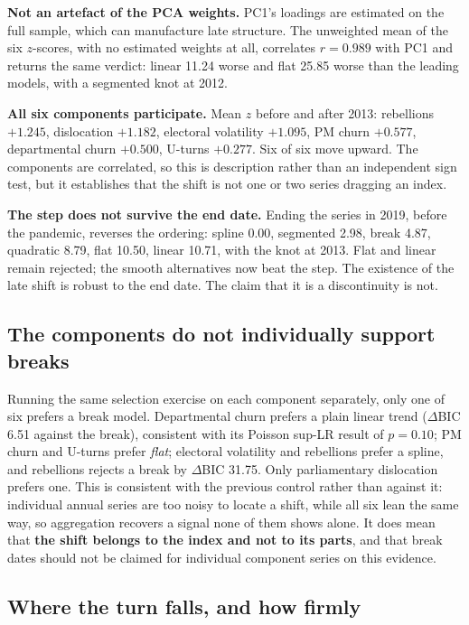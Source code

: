 \textbf{Not an artefact of the PCA weights.} PC1's loadings are estimated on the full sample, which
can manufacture late structure. The unweighted mean of the six $z$-scores, with no estimated weights
at all, correlates $r=0.989$ with PC1 and returns the same verdict: linear 11.24 worse and flat
25.85 worse than the leading models, with a segmented knot at 2012.

\textbf{All six components participate.} Mean $z$ before and after 2013: rebellions $+1.245$,
dislocation $+1.182$, electoral volatility $+1.095$, PM churn $+0.577$, departmental churn $+0.500$,
U-turns $+0.277$. Six of six move upward. The components are correlated, so this is description
rather than an independent sign test, but it establishes that the shift is not one or two series
dragging an index.

\textbf{The step does not survive the end date.} Ending the series in 2019, before the pandemic,
reverses the ordering: spline 0.00, segmented 2.98, break 4.87, quadratic 8.79, flat 10.50, linear
10.71, with the knot at 2013. Flat and linear remain rejected; the smooth alternatives now beat the
step. The existence of the late shift is robust to the end date. The claim that it is a
discontinuity is not.

\subsection*{The components do not individually support breaks}

Running the same selection exercise on each component separately, only one of six prefers a break
model. Departmental churn prefers a plain linear trend ($\Delta$BIC 6.51 against the break),
consistent with its Poisson sup-LR result of $p=0.10$; PM churn and U-turns prefer \emph{flat};
electoral volatility and rebellions prefer a spline, and rebellions rejects a break by $\Delta$BIC
31.75. Only parliamentary dislocation prefers one. This is consistent with the previous control
rather than against it: individual annual series are too noisy to locate a shift, while all six
lean the same way, so aggregation recovers a signal none of them shows alone. It does mean that
\textbf{the shift belongs to the index and not to its parts}, and that break dates should not be
claimed for individual component series on this evidence.

\subsection*{Where the turn falls, and how firmly}

